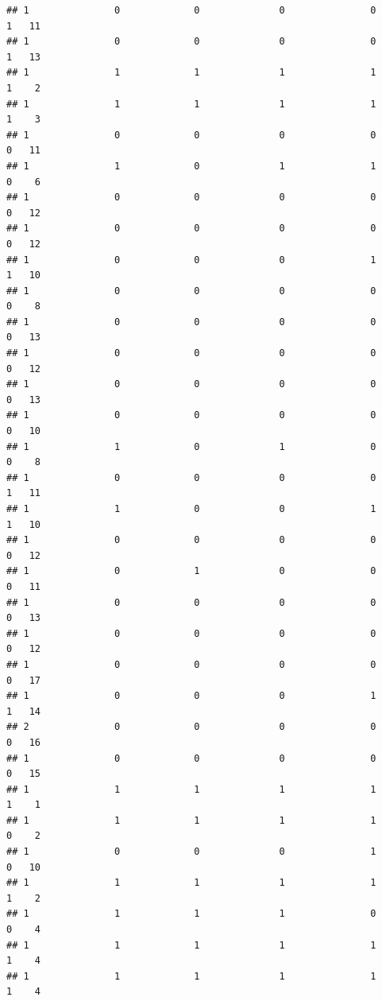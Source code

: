 \documentclass[
]{article}
\begin{document}
\begin{verbatim}
## 1               0             0              0               0           1   11
## 1               0             0              0               0           1   13
## 1               1             1              1               1           1    2
## 1               1             1              1               1           1    3
## 1               0             0              0               0           0   11
## 1               1             0              1               1           0    6
## 1               0             0              0               0           0   12
## 1               0             0              0               0           0   12
## 1               0             0              0               1           1   10
## 1               0             0              0               0           0    8
## 1               0             0              0               0           0   13
## 1               0             0              0               0           0   12
## 1               0             0              0               0           0   13
## 1               0             0              0               0           0   10
## 1               1             0              1               0           0    8
## 1               0             0              0               0           1   11
## 1               1             0              0               1           1   10
## 1               0             0              0               0           0   12
## 1               0             1              0               0           0   11
## 1               0             0              0               0           0   13
## 1               0             0              0               0           0   12
## 1               0             0              0               0           0   17
## 1               0             0              0               1           1   14
## 2               0             0              0               0           0   16
## 1               0             0              0               0           0   15
## 1               1             1              1               1           1    1
## 1               1             1              1               1           0    2
## 1               0             0              0               1           0   10
## 1               1             1              1               1           1    2
## 1               1             1              1               0           0    4
## 1               1             1              1               1           1    4
## 1               1             1              1               1           1    4

\end{verbatim}
\end{document}
